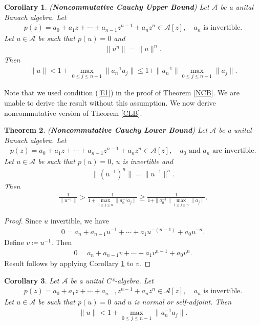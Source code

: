 \documentclass{amsart}
\newtheorem{theorem}{Theorem}[section]
\newtheorem{corollary}[theorem] {Corollary}
\begin{document}
\begin{corollary}\label{GNCB}
(\textbf{Noncommutative Cauchy Upper Bound}) Let $\mathcal{A}$ be a unital Banach algebra. Let 
\begin{align*}
	p(z)=a_0+a_1z+\cdots+a_{n-1}z^{n-1}+a_nz^n\in \mathcal{A}[z], \quad a_n \text{ is invertible}.
\end{align*}
Let $u \in \mathcal{A}$ be such that $p(u)=0$ and 
\begin{align*}
	\|u^n\|=\|u\|^n.
\end{align*}
Then 
\begin{align*}
	\|u\|< 1+\max_{0\leq j \leq n-1}\|a_n^{-1}a_j\|\leq 1+\|a^{-1}_n\|\max_{0\leq j \leq n-1}\|a_j\|.
\end{align*}	
\end{corollary}
Note that we used condition (\ref{E1}) in the proof of Theorem \ref{NCB}. We are unable to derive the result without this assumption. We now derive noncommutative version of Theorem \ref{CLB}.
\begin{theorem}
(\textbf{Noncommutative Cauchy Lower Bound}) Let $\mathcal{A}$ be a unital Banach algebra. Let 
\begin{align*}
	p(z)=a_0+a_1z+\cdots+a_{n-1}z^{n-1}+a_nz^n\in \mathcal{A}[z], \quad a_0\text{ and } a_n \text{ are invertible}.
\end{align*}
Let $u \in \mathcal{A}$ be such that $p(u)=0$, $u$ is invertible  and 
\begin{align*}
	\|(u^{-1})^n\|=\|u^{-1}\|^n.
\end{align*}
Then 
\begin{align*}
	\frac{1}{\|u^{-1}\|}>\frac{1}{1+\max_{1\leq j \leq n}\|a_0^{-1}a_j\|}\geq \frac{1}{1+\|a^{-1}_0\|\max_{1\leq j \leq n}\|a_j\|}.
\end{align*}	
\end{theorem}
\begin{proof}
	Since $u$ invertible, we have 
	\begin{align*}
		0=a_n+a_{n-1}u^{-1}+\cdots+a_1u^{-(n-1)}+a_0u^{-n}.
	\end{align*}
Define $v\coloneqq u^{-1}$. Then 
\begin{align*}
	0=a_n+a_{n-1}v+\cdots+a_1v^{n-1}+a_0v^n.
\end{align*}
Result follows by applying Corollary \ref{GNCB} to $v$.
\end{proof}
\begin{corollary}
	Let $\mathcal{A}$ be a unital C*-algebra. Let 
	\begin{align*}
		p(z)=a_0+a_1z+\cdots+a_{n-1}z^{n-1}+a_nz^n\in \mathcal{A}[z], \quad a_n \text{ is invertible}.
	\end{align*}
	Let $u \in \mathcal{A}$ be such that $p(u)=0$ and $u$ is normal or self-adjoint.
	Then 
	\begin{align*}
		\|u\|< 1+\max_{0\leq j \leq n-1}\|a_n^{-1}a_j\|.
	\end{align*}
\end{corollary}
\end{document}
